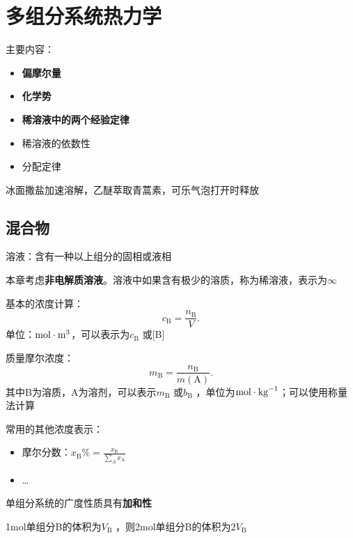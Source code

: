 \section{多组分系统热力学}%
\label{sec:多组分系统热力学}
主要内容：
\begin{itemize}
    \item \textbf{偏摩尔量}
    \item \textbf{化学势}
    \item \textbf{稀溶液中的两个经验定律}
    \item 稀溶液的依数性
    \item 分配定律
\end{itemize}
\begin{eg}
    冰面撒盐加速溶解，乙醚萃取青蒿素，可乐气泡打开时释放
\end{eg}
\subsection{混合物}%
\label{sub:混合物}
\begin{notation}
    溶液：含有一种以上组分的固相或液相
\end{notation}
本章考虑\textbf{非电解质溶液}。溶液中如果含有极少的溶质，称为稀溶液，表示为$\infty $
\begin{notation}
    基本的浓度计算：\[
        c_\text{B} = \frac{n_\text{B}}{V}
    .\]
    单位：$\ce{mol}\cdot \ce{m}^{3}$，可以表示为$c_\text{B}$ 或[B]
\end{notation}
\begin{notation}
    质量摩尔浓度：\[
        m_\text{B} = \frac{n_\text{B}}{m\left( \text{A} \right)}
    .\]
    其中B为溶质，A为溶剂，可以表示$m_\text{B}$ 或$b_\text{B}$ ，单位为$\ce{mol}\cdot \text{kg}^{-1}$；可以使用称量法计算
\end{notation}
常用的其他浓度表示：
\begin{itemize}
    \item 摩尔分数：$x_\text{B}\% = \frac{x_\text{B}}{\sum_{A}^{} x_\text{A}}$
    \item \ldots 
\end{itemize}
单组分系统的广度性质具有\textbf{加和性}
\begin{eg}
    1mol单组分B的体积为$V_\text{B}$ ，则2mol单组分B的体积为$2V_\text{B}$
\end{eg}
